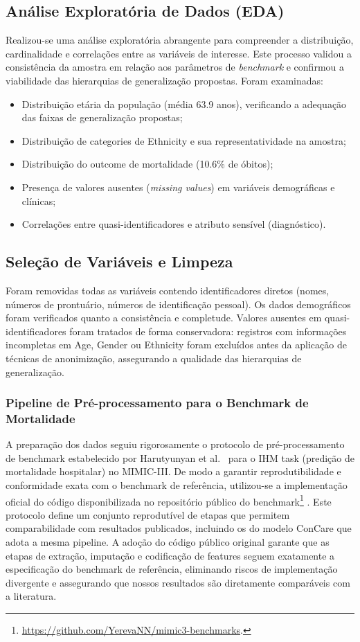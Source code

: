 \subsection{Análise Exploratória de Dados (EDA)}
Realizou-se uma análise exploratória abrangente para compreender a distribuição, cardinalidade e correlações entre as variáveis de interesse. Este processo validou a consistência da amostra em relação aos parâmetros de \textit{benchmark} e confirmou a viabilidade das hierarquias de generalização propostas. Foram examinadas:
\begin{itemize}
    \item Distribuição etária da população (média 63.9 anos), verificando a adequação das faixas de generalização propostas;
    \item Distribuição de categories de Ethnicity e sua representatividade na amostra;
    \item Distribuição do outcome de mortalidade (10.6\% de óbitos);
    \item Presença de valores ausentes (\textit{missing values}) em variáveis demográficas e clínicas;
    \item Correlações entre quasi-identificadores e atributo sensível (diagnóstico).
\end{itemize}

\subsection{Seleção de Variáveis e Limpeza}
Foram removidas todas as variáveis contendo identificadores diretos (nomes, números de prontuário, números de identificação pessoal). Os dados demográficos foram verificados quanto a consistência e completude. Valores ausentes em quasi-identificadores foram tratados de forma conservadora: registros com informações incompletas em Age, Gender ou Ethnicity foram excluídos antes da aplicação de técnicas de anonimização, assegurando a qualidade das hierarquias de generalização.

\subsubsection{Pipeline de Pré-processamento para o Benchmark de Mortalidade}

A preparação dos dados seguiu rigorosamente o protocolo de pré-processamento de benchmark estabelecido por Harutyunyan et al.\ \cite{Harutyunyan2019} para o IHM task (predição de mortalidade hospitalar) no MIMIC-III. De modo a garantir reprodutibilidade e conformidade exata com o benchmark de referência, utilizou-se a implementação oficial do código disponibilizada no repositório público do benchmark\footnote{\url{https://github.com/YerevaNN/mimic3-benchmarks}.} \cite{Harutyunyan2019}. Este protocolo define um conjunto reprodutível de etapas que permitem comparabilidade com resultados publicados, incluindo os do modelo ConCare \cite{Ma2020} que adota a mesma pipeline. A adoção do código público original garante que as etapas de extração, imputação e codificação de features seguem exatamente a especificação do benchmark de referência, eliminando riscos de implementação divergente e assegurando que nossos resultados são diretamente comparáveis com a literatura.

